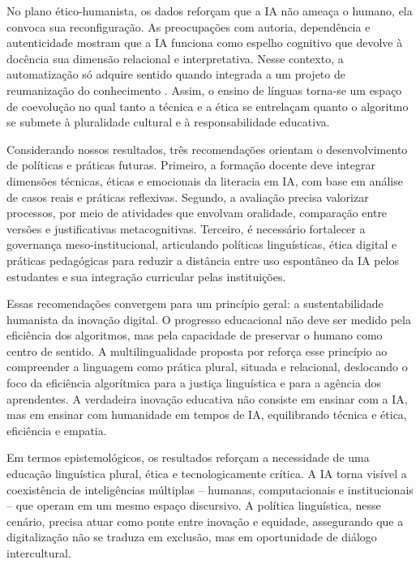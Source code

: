\documentclass[portuguese]{textolivre}
\begin{document}
No plano ético-humanista, os dados reforçam que a IA não ameaça o humano, ela convoca sua reconfiguração. As preocupações com autoria, dependência e autenticidade mostram que a IA funciona como espelho cognitivo que devolve à docência sua dimensão relacional e interpretativa. Nesse contexto, a automatização só adquire sentido quando integrada a um projeto de reumanização do conhecimento \cite{PiresAmaro2025}. Assim, o ensino de línguas torna-se um espaço de coevolução no qual tanto a técnica e a ética se entrelaçam quanto o algoritmo se submete à pluralidade cultural e à responsabilidade educativa.

Considerando nossos resultados, três recomendações orientam o desenvolvimento de políticas e práticas futuras. Primeiro, a formação docente deve integrar dimensões técnicas, éticas e emocionais da literacia em IA, com base em análise de casos reais e práticas reflexivas. Segundo, a avaliação precisa valorizar processos, por meio de atividades que envolvam oralidade, comparação entre versões e justificativas metacognitivas. Terceiro, é necessário fortalecer a governança meso-institucional, articulando políticas linguísticas, ética digital e práticas pedagógicas para reduzir a distância entre uso espontâneo da IA pelos estudantes e sua integração curricular pelas instituições.

Essas recomendações convergem para um princípio geral: a sustentabilidade humanista da inovação digital. O progresso educacional não deve ser medido pela eficiência dos algoritmos, mas pela capacidade de preservar o humano como centro de sentido. A multilingualidade proposta por \textcite{Agnihotri2025} reforça esse princípio ao compreender a linguagem como prática plural, situada e relacional, deslocando o foco da eficiência algorítmica para a justiça linguística e para a agência dos aprendentes. A verdadeira inovação educativa não consiste em ensinar com a IA, mas em ensinar com humanidade em tempos de IA, equilibrando técnica e ética, eficiência e empatia.

Em termos epistemológicos, os resultados reforçam a necessidade de uma educação linguística plural, ética e tecnologicamente crítica. A IA torna visível a coexistência de inteligências múltiplas – humanas, computacionais e institucionais – que operam em um mesmo espaço discursivo. A política linguística, nesse cenário, precisa atuar como ponte entre inovação e equidade, assegurando que a digitalização não se traduza em exclusão, mas em oportunidade de diálogo intercultural.
\end{document}
